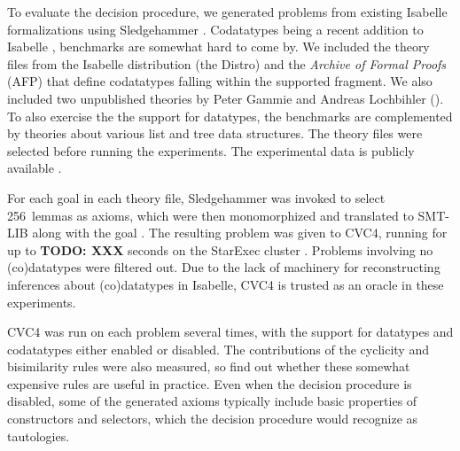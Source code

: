 To evaluate the decision procedure, we generated problems from existing
Isabelle formalizations using Sledgehammer \cite{paulson-blanchette-2010}.
Codatatypes being a recent addition to Isabelle
\cite{blanchette-et-al-2014-impl}, benchmarks are somewhat hard to come by. We
included the theory files from the Isabelle distribution (the Distro) and the \emph{Archive
of Formal Proofs} (AFP) \cite{klein-et-al-afp} that define codatatypes falling
within the supported fragment. We also included two unpublished theories by
Peter Gammie and Andreas Lochbihler (\gandl). To also exercise the the support
for datatypes, the benchmarks are complemented by theories about various list
and tree data structures. The theory files were selected before running the
experiments. The experimental data is publicly available \cite{our-eval-data}.

For each goal in each theory file, Sledgehammer was invoked to select
256~lemmas as axioms, which were then monomorphized and translated to SMT-LIB
along with the goal \cite{boehme-2012-phd}. The resulting problem was given to
CVC4, running for up to \textbf{TODO: XXX} seconds on the StarExec cluster
\cite{xxx}. Problems involving no (co)datatypes were filtered out.
Due to the lack of machinery for reconstructing inferences about (co)datatypes
in Isabelle, CVC4 is trusted as an oracle in these experiments.

CVC4 was run on each problem several times, with the support for datatypes and
codatatypes either enabled or disabled. The contributions of the cyclicity and
bisimilarity rules were also measured, so find out whether these somewhat
expensive rules are useful in practice. Even when the decision procedure is
disabled, some of the generated axioms typically include basic properties of
constructors and selectors, which the decision procedure would recognize as
tautologies.

\newcommand\BAD[1]{\textcolor{red}{\textbf{#1}}}



